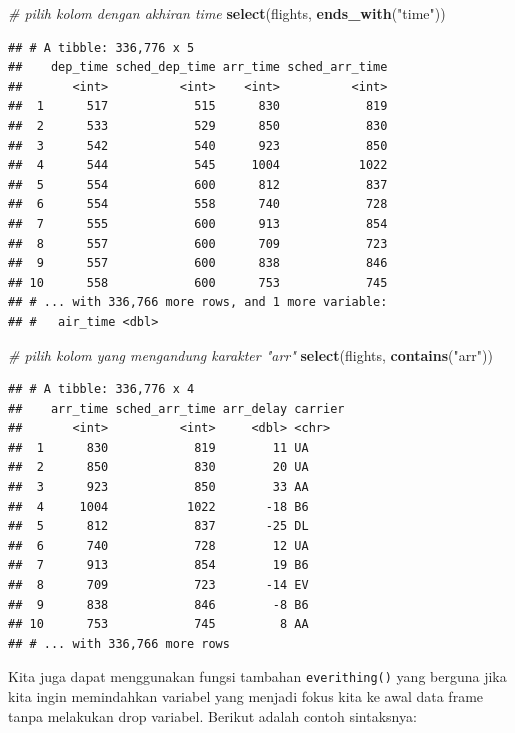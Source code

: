 \documentclass[]{book}
\newenvironment{Shaded}{\begin{snugshade}}{\end{snugshade}}
\newcommand{\KeywordTok}[1]{\textcolor[rgb]{0.13,0.29,0.53}{\textbf{#1}}}
\newcommand{\StringTok}[1]{\textcolor[rgb]{0.31,0.60,0.02}{#1}}
\newcommand{\CommentTok}[1]{\textcolor[rgb]{0.56,0.35,0.01}{\textit{#1}}}
\newcommand{\NormalTok}[1]{#1}
\begin{document}
\begin{Shaded}
\begin{Highlighting}[]
\CommentTok{# pilih kolom dengan akhiran time}
\KeywordTok{select}\NormalTok{(flights, }\KeywordTok{ends_with}\NormalTok{(}\StringTok{"time"}\NormalTok{))}
\end{Highlighting}
\end{Shaded}

\begin{verbatim}
## # A tibble: 336,776 x 5
##    dep_time sched_dep_time arr_time sched_arr_time
##       <int>          <int>    <int>          <int>
##  1      517            515      830            819
##  2      533            529      850            830
##  3      542            540      923            850
##  4      544            545     1004           1022
##  5      554            600      812            837
##  6      554            558      740            728
##  7      555            600      913            854
##  8      557            600      709            723
##  9      557            600      838            846
## 10      558            600      753            745
## # ... with 336,766 more rows, and 1 more variable:
## #   air_time <dbl>
\end{verbatim}

\begin{Shaded}
\begin{Highlighting}[]
\CommentTok{# pilih kolom yang mengandung karakter "arr"}
\KeywordTok{select}\NormalTok{(flights, }\KeywordTok{contains}\NormalTok{(}\StringTok{"arr"}\NormalTok{))}
\end{Highlighting}
\end{Shaded}

\begin{verbatim}
## # A tibble: 336,776 x 4
##    arr_time sched_arr_time arr_delay carrier
##       <int>          <int>     <dbl> <chr>  
##  1      830            819        11 UA     
##  2      850            830        20 UA     
##  3      923            850        33 AA     
##  4     1004           1022       -18 B6     
##  5      812            837       -25 DL     
##  6      740            728        12 UA     
##  7      913            854        19 B6     
##  8      709            723       -14 EV     
##  9      838            846        -8 B6     
## 10      753            745         8 AA     
## # ... with 336,766 more rows
\end{verbatim}

Kita juga dapat menggunakan fungsi tambahan \texttt{everithing()} yang
berguna jika kita ingin memindahkan variabel yang menjadi fokus kita ke
awal data frame tanpa melakukan drop variabel. Berikut adalah contoh
sintaksnya:
\end{document}
